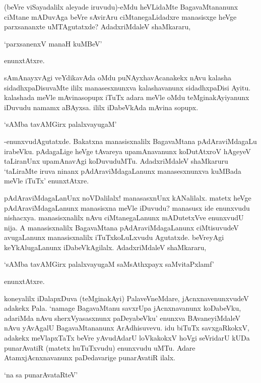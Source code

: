 (beVre viSayadalilx aleyade iruvudu)-eMdu heVLidaMte BagavaMtananunx ciMtane mADuvAga beVre sAvirAru ciMtanegaLidadxre manasisxge heVge parxsananxte uMTAgutatxde? AdadxriMdaleV shaMkararu,

\begin{shloka}
`parxsanenxV manaH kuMBeV'
\end{shloka}

enunxtAtxre.

sAmAnayxvAgi veYdikavAda oMdu puNAyxhavAcanakekx nAvu kalasha sidadhxpaDisuvaMte ililx manasesxnunxva kalashavanunx sidadhxpaDisi Ayitu. kalashada meVle mAvinasopupx iTuTx adara meVle oMdu teMginakAyiyanunx iDuvudu namamx aBAyxsa. ililx iDabeVkAda mAvina sopupx.

\begin{shloka}
`sAMba tavAMGirx palalxvayugaM'
\end{shloka}

-enunxvudAgutatxde. Bakatxna manasisxnalilx BagavaMtana pAdAraviMdagaLu irabeVku. pAdagaLige heVge tAvareya upamAnavanunx koDutAtxroV hAgeyeV taLiranUnx upamAnavAgi koDuvuduMTu. AdadxriMdaleV shaMkaruru `taLiraMte iruva ninanx pAdAraviMdagaLanunx manasesxnunxva kuMBada meVle iTuTx' enunxtAtxre.

pAdAraviMdagaLanUnx noVDalilalx! manasasxnUnx kANalilalx. matetx heVge pAdAraviMdagaLanunx manasisxna meVle iDuvudu? manasusx ide enunxvudu nishacxya. manasisxnalilx nAvu ciMtanegaLanunx mADutetxVve enunxvudU nija. A manasisxnalilx BagavaMtana pAdAraviMdagaLanunx ciMtisuvudeV avugaLanunx manasisxnalilx iTuTxkoLuLxvudu Agutatxde. beVreyAgi keYkAlugaLanunx iDabeVkAgilalx. AdadxriMdaleV shaMkararu,

\begin{shloka}
`sAMba tavAMGirx palalxvayugaM saMsAthxpayx saMvitaPxlamf'
\end{shloka}

enunxtAtxre.

koneyalilx iDalapxDuva (teMginakAyi) PalaveVneMdare, jAcnxnavenunxvudeV adakekx Pala. `namage BagavaMtanu savxrUpa jAcnxnavanunx koDabeVku, adariMda nAvu sherxVyasasxnunx paDeyabeVku' enunxva BAvaneyiMdaleV nAvu yAvAgalU BagavaMtananunx ArAdhisuvevu. idu biTuTx savxgaRkokxV, adakekx meVlapxTaTx beVre yAvudAdarU loVkakokxV hoVgi seVridarU kUDa punarAvatiR (matetx huTuTxvudu) enunxvudu uMTu. Adare AtamxjAcnxnavanunx paDedavarige punarAvatiR ilalx. 

\begin{shloka}
`na sa punarAvataRteV'
\end{shloka}

